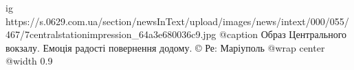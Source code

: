  
 
 
 
 

\ifcmt
  ig https://s.0629.com.ua/section/newsInText/upload/images/news/intext/000/055/467/7centralstationimpression_64a3e680036c9.jpg
	@caption Образ Центрального вокзалу. Емоція радості повернення додому.  © Ре: Маріуполь
  @wrap center
  @width 0.9
\fi
